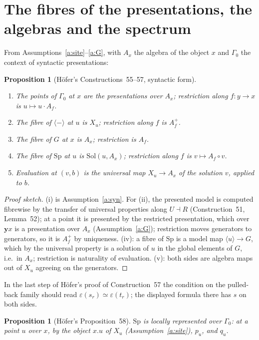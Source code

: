 \documentclass[11pt]{amsart}
\newtheorem{proposition}[theorem]{Proposition}
\theoremstyle{definition}
\theoremstyle{remark}
\newcommand{\Sp}{\mathrm{Sp}}
\newcommand{\Sol}{\mathrm{Sol}}
\newcommand{\yo}{\mathbf{y}}
\newcommand{\pres}[1]{\langle #1\rangle}
\begin{document}
\section{The fibres of the presentations, the algebras and the spectrum}\label{sec:fibres}

From Assumptions~\ref{a:site}--\ref{a:G}, with $A_x$ the algebra of the
object $x$ and $\Gamma_0$ the context of syntactic presentations:

\begin{proposition}[H\"ofer's Constructions~55--57, syntactic form]\label{prop:fibres}
\begin{enumerate}[label=(\roman*)]
\item The points of $\Gamma_0$ at $x$ are the presentations over $A_x$;
restriction along $f\colon y\to x$ is $u\mapsto u\cdot A_f$.
\item The fibre of $\pres{-}$ at $u$ is $X_u$; restriction along $f$ is
$A_f^+$.
\item The fibre of $G$ at $x$ is $A_x$; restriction is $A_f$.
\item The fibre of $\Sp$ at $u$ is $\Sol(u,A_x)$; restriction along $f$ is
$v\mapsto A_f\circ v$.
\item Evaluation at $(v,b)$ is the universal map $X_u\to A_x$ of the
solution $v$, applied to $b$.
\end{enumerate}
\end{proposition}

\begin{proof}[Proof sketch]
(i) is Assumption~\ref{a:syn}. For (ii), the presented model is computed
fibrewise by the transfer of universal properties along $U\dashv R$
(Construction~51, Lemma~52); at a point it is presented by the restricted
presentation, which over $\yo x$ is a presentation over $A_x$
(Assumption~\ref{a:G}); restriction moves generators to generators, so it
is $A_f^+$ by uniqueness. (iv): a fibre of $\Sp$ is a model map
$\pres u\to G$, which by the universal property is a solution of $u$ in the
global elements of $G$, i.e.\ in $A_x$; restriction is naturality of
evaluation. (v): both sides are algebra maps out of $X_u$ agreeing on the
generators.
\end{proof}

In the last step of H\"ofer's proof of Construction~57 the condition on the
pulled-back family should read $\varepsilon(s_r)\simeq\varepsilon(t_r)$;
the displayed formula there has $s$ on both sides.

\begin{proposition}[H\"ofer's Proposition~58]\label{prop:58}
$\Sp$ is locally represented over $\Gamma_0$: at a point $u$ over $x$, by
the object $x.u$ of $X_u$ (Assumption~\ref{a:site}), $p_u$, and $q_u$.
\end{proposition}
\end{document}
